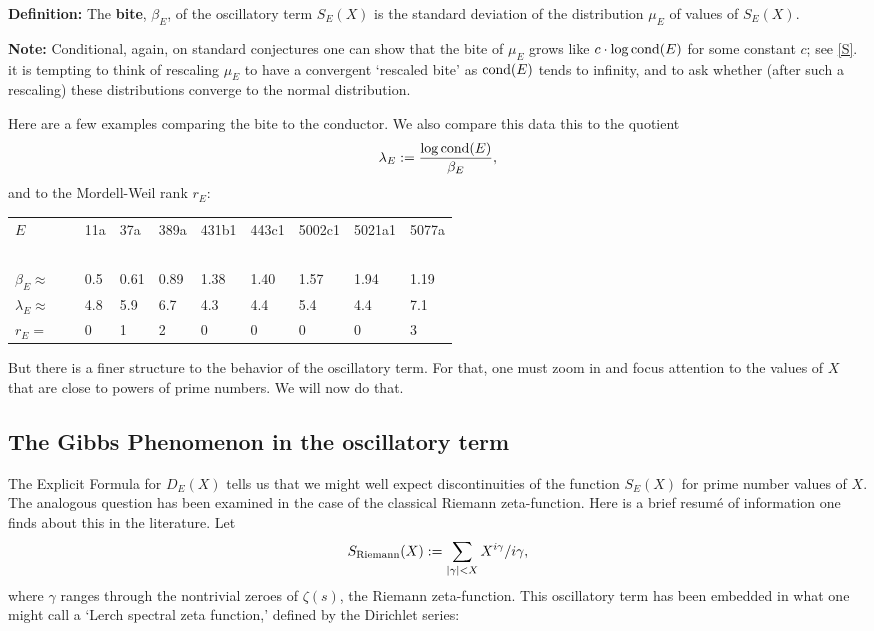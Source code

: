 \documentclass[11pt]{article}
\theoremstyle{plain}
\theoremstyle{definition}
\newtheorem{project}[theorem]{Project}
\numberwithin{equation}{section}
\numberwithin{figure}{section}
\numberwithin{table}{section}
\def\S{\mathcal{S}}
\begin{document}

   {\bf Definition:}  The {\bf bite}, $\beta_E$, of the oscillatory term $S_E(X)$ is the standard deviation of the   distribution $\mu_E$ of values of $S_E(X)$.

    {\bf  Note: } Conditional, again,  on standard conjectures  one can show that the bite of $\mu_E$  grows like $c\cdot \log {\rm cond}(E)$ for some constant $c$; see \ref{S}. it is tempting to think of rescaling $\mu_E$ to have a convergent `rescaled bite' as ${\rm cond}(E)$ tends to infinity, and to ask whether (after such a rescaling) these distributions converge to the normal distribution.

 Here are a few examples comparing the bite to the conductor. We also compare this data this to the quotient $$\lambda_E:={\frac{ \log {\rm cond}(E)}{\beta_E}},$$ and to the Mordell-Weil rank $r_E$:



  \begin{tabular}{llllllllll}
  $E$   &\ & 11a & 37a & 389a & 431b1 & 443c1 & 5002c1 & 5021a1 & 5077a\\
\  &\ &\  &\  &\  &\ &\ &\ &\ &\ \\
  $\beta_E \approx $  &\ & 0.5 & 0.61 & 0.89 & 1.38 & 1.40 & 1.57 & 1.94 & 1.19\\
  $\lambda_E  \approx$  &\ & 4.8 & 5.9 & 6.7 & 4.3 & 4.4 & 5.4 & 4.4 & 7.1\\
  $r_E =$   &\ & 0 & 1 & 2 & 0 & 0 & 0 & 0 & 3 \end{tabular}
\vskip10pt

  But there is a finer structure to the behavior of the oscillatory term. For that, one must zoom in and focus attention to the values of $X$ that are close to powers of prime numbers. We will now do that.


 \subsection{ The Gibbs Phenomenon in the oscillatory term} The Explicit Formula for $D_E(X)$ tells us that we might well expect discontinuities of the function $S_E(X)$ for prime number values of $X$. The analogous question has been  examined in the case of the classical Riemann zeta-function.  Here is a brief resum{\'e} of information one finds about this in the literature. Let $$S_{\rm Riemann}(X): = \sum_{|\gamma|<X}X^{i\gamma}/i\gamma,$$ where $\gamma$ ranges through the nontrivial zeroes of $\zeta(s)$, the Riemann zeta-function. This oscillatory term has been  embedded in what one might call a `Lerch spectral zeta function,' defined by the Dirichlet series:
\end{document}
